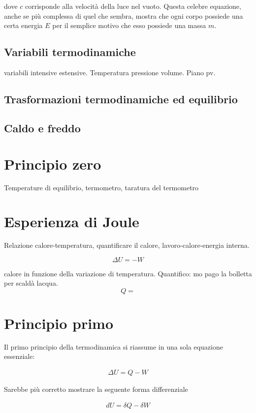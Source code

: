 \noindent dove $c$ corrisponde alla velocità della luce nel vuoto.
Questa celebre equazione, anche se più complessa di quel che
sembra, mostra che ogni corpo possiede una certa energia $E$ per il semplice
motivo che esso possiede una massa $m$.

\subsection{Variabili termodinamiche}
variabili intensive estensive. Temperatura pressione volume. Piano pv.


\subsection{Trasformazioni termodinamiche ed equilibrio}

\subsection{Caldo e freddo}

\section{Principio zero}
Temperature di equilibrio, termometro, taratura del termometro

\section{Esperienza di Joule}
Relazione calore-temperatura, quantificare il calore, lavoro-calore-energia interna.

\[ \Delta U = -W \]

calore in funzione della variazione di temperatura. Quantifico: mo pago
la bolletta per scaldà lacqua.
\[ Q =  \]


\section{Principio primo}
Il primo principio della termodinamica si riassume in una sola
equazione essenziale:

\begin{align}
    \Delta U = Q - W
\end{align}

\noindent Sarebbe più corretto mostrare la seguente forma differenziale

\begin{tcolorbox}[colback = red!30, colframe = red!30!black, title = {Primo principio della termodinamica}]
\begin{align}
    dU = \delta Q - \delta W
\end{align}
\end{tcolorbox}

